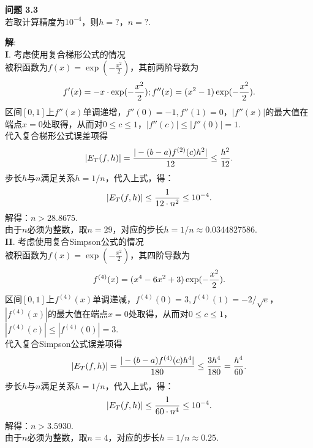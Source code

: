 \documentclass[UTF8]{ctexart}
\newenvironment{problem}[2][问题]
{\begin{mdframed}[backgroundcolor=gray!20] \textbf{#1 #2} \\}
	{\end{mdframed}}
\begin{document}
\begin{problem}{3.3}
	若取计算精度为$10^{-4}$，则$h = ?$，$n = ?$.
\end{problem}
\textbf{解}:\\
\textbf{I}. 考虑使用复合梯形公式的情况\\
被积函数为$f(x)= \exp (-\frac{x^{2}}{2})$，其前两阶导数为
\begin{align}
	f'(x) = -x \cdot \exp (-\frac{x^{2}}{2});
	f''(x) = (x^2 - 1) \exp (-\frac{x^{2}}{2}). \notag
\end{align}
区间$[0,1]$上$f''(x)$单调递增，$f''(0)=-1, f''(1)=0$，$|f''(x)|$的最大值在端点$x=0$处取得，从而对$0\leq c \leq 1$，$|f''(c)| \leq |f''(0)| = 1$.\\
代入复合梯形公式误差项得
\begin{align}
	|E_{T}(f, h)| = \frac{|-(b-a) f^{(2)}(c) h^{2}|}{12} \leq \frac{h^2}{12}. \notag
\end{align}
步长$h$与$n$满足关系$h=1/n$，代入上式，得：
\begin{align}
	|E_{T}(f, h)| \leq \frac{1}{12\cdot n^2} \leq 10^{-4}. \notag
\end{align}
解得：$n>28.8675$. \\
由于$n$必须为整数，取$n=29$，对应的步长$h=1/n\approx 0.0344827586$.\\
\textbf{II}. 考虑使用复合Simpson公式的情况\\
被积函数为$f(x)= \exp (-\frac{x^{2}}{2})$，其四阶导数为
\begin{align}
	f^{(4)}(x) = (x^4 - 6x^2 + 3) \exp (-\frac{x^{2}}{2}). \notag
\end{align}
区间$[0,1]$上$f^{(4)}(x)$单调递减，$f^{(4)}(0)=3, f^{(4)}(1)=-2/\sqrt{e}$，$|f^{(4)}(x)|$的最大值在端点$x=0$处取得，从而对$0\leq c \leq 1$，$|f^{(4)}(c)| \leq |f^{(4)}(0)| = 3$.\\
代入复合Simpson公式误差项得
\begin{align}
	|E_{T}(f, h)| = \frac{|-(b-a) f^{(4)}(c) h^{4}|}{180} \leq \frac{3h^4}{180} = \frac{h^4}{60}. \notag
\end{align}
步长$h$与$n$满足关系$h=1/n$，代入上式，得：
\begin{align}
	|E_{T}(f, h)| \leq \frac{1}{60\cdot n^4} \leq 10^{-4}. \notag
\end{align}
解得：$n>3.5930$. \\
由于$n$必须为整数，取$n=4$，对应的步长$h=1/n\approx 0.25$.
\end{document}
